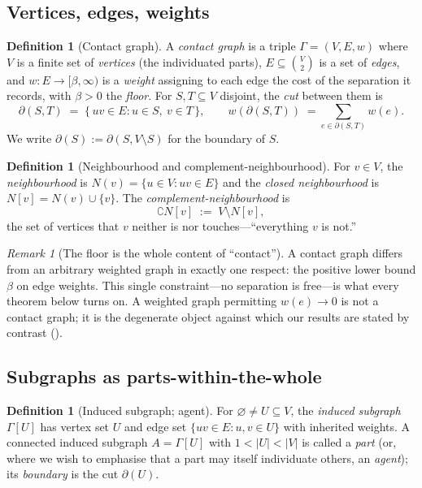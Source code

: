 \documentclass[11pt,a4paper]{article}
\theoremstyle{thmstyle}
\theoremstyle{definition}
\newtheorem{definition}[theorem]{Definition}
\theoremstyle{remark}
\newtheorem{remark}[theorem]{Remark}
\newcommand{\Gph}{\Gamma}                 %
\newcommand{\V}{V}                        %
\newcommand{\E}{E}                        %
\newcommand{\wt}{w}                       %
\newcommand{\floorc}{\beta}               %
\newcommand{\Nbr}{N}                      %
\newcommand{\co}{\complement}             %
\newcommand{\cut}{\partial}               %
\newcommand{\Agent}{A}                    %
\newcommand{\abs}[1]{\lvert#1\rvert}
\begin{document}
\subsection{Vertices, edges, weights}

\begin{definition}[Contact graph]
\label{def:contactgraph}
A \emph{contact graph} is a triple $\Gph=(\V,\E,\wt)$ where $\V$ is a finite set
of \emph{vertices} (the individuated parts), $\E\subseteq\binom{\V}{2}$ is a set
of \emph{edges}, and $\wt\colon\E\to[\floorc,\infty)$ is a \emph{weight}
assigning to each edge the cost of the separation it records, with
$\floorc>0$ the \emph{floor}. For $S,T\subseteq\V$ disjoint, the
\emph{cut} between them is
\[
\cut(S,T)\;=\;\{\,uv\in\E : u\in S,\ v\in T\,\},
\qquad
\wt(\cut(S,T))\;=\!\!\sum_{e\in\cut(S,T)}\!\!\wt(e).
\]
We write $\cut(S):=\cut(S,\V\setminus S)$ for the boundary of $S$.
\end{definition}

\begin{definition}[Neighbourhood and complement-neighbourhood]
\label{def:nbr}
For $v\in\V$, the \emph{neighbourhood} is
$\Nbr(v)=\{u\in\V : uv\in\E\}$ and the \emph{closed neighbourhood} is
$\Nbr[v]=\Nbr(v)\cup\{v\}$. The \emph{complement-neighbourhood} is
\[
\co\Nbr[v]\;:=\;\V\setminus\Nbr[v],
\]
the set of vertices that $v$ neither is nor touches---``everything $v$ is not.''
\end{definition}

\begin{remark}[The floor is the whole content of ``contact'']
\label{rem:floor-content}
A contact graph differs from an arbitrary weighted graph in exactly one
respect: the positive lower bound $\floorc$ on edge weights. This single
constraint---no separation is free---is what every theorem below turns on. A
weighted graph permitting $\wt(e)\to0$ is not a contact graph; it is the
degenerate object against which our results are stated by contrast
().
\end{remark}

\subsection{Subgraphs as parts-within-the-whole}

\begin{definition}[Induced subgraph; agent]
\label{def:subgraph}
For $\varnothing\neq U\subseteq\V$, the \emph{induced subgraph} $\Gph[U]$ has
vertex set $U$ and edge set $\{uv\in\E : u,v\in U\}$ with inherited weights. A
connected induced subgraph $\Agent=\Gph[U]$ with $1<\abs{U}<\abs{\V}$ is called a
\emph{part} (or, where we wish to emphasise that a part may itself individuate
others, an \emph{agent}); its \emph{boundary} is the cut $\cut(U)$.
\end{definition}
\end{document}
